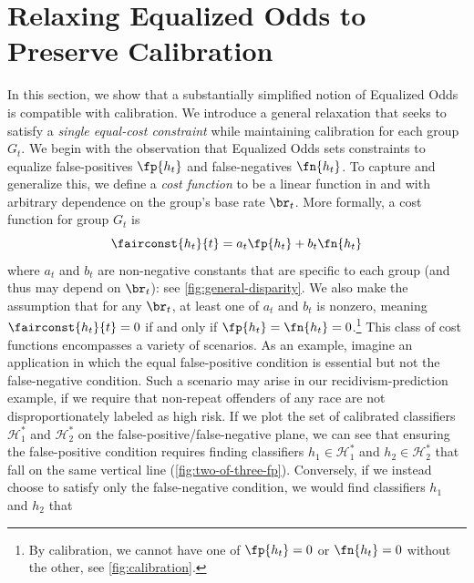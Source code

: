
\section{Relaxing Equalized Odds to Preserve Calibration}
\label{sec:relaxation}

In this section, we show that a substantially simplified notion of Equalized Odds
is compatible with calibration.
We introduce a general relaxation that seeks
to satisfy a \emph{single equal-cost constraint} while maintaining calibration for each group $G_t$.
%
We begin with the observation that Equalized Odds
sets constraints to equalize
false-positives $\fp{h_t}$ and false-negatives $\fn{h_t}$. To capture and
generalize this, we define a
\emph{cost function} \fairconstname{} to be a linear function in  and
 with arbitrary dependence on the group's base rate $\br_t$.
More formally, a cost function for group $G_t$ is
\begin{equation}
  \fairconst{h_t}{t} = a_t \fp{h_t} + b_t \fn{h_t}
  \label{eqn:cost_general}
\end{equation}
where $a_{t}$ and $b_{t}$ are non-negative constants that are specific to each group (and
thus may depend on $\br_t$): see \autoref{fig:general-disparity}. We also make
the assumption that for any $\br_t$,
at least one of $a_t$ and $b_t$ is nonzero, meaning
$\fairconst{h_t}{t} = 0$ if and only if $\fp{h_t} = \fn{h_t} = 0$.\footnote{
  By calibration, we cannot have one of $\fp{h_t} = 0$ or $\fn{h_t} = 0$
  without the other, see \autoref{fig:calibration}.
}
This class of cost functions encompasses a
variety of scenarios.
As an example, imagine an application in which the equal false-positive
condition is essential but not the
false-negative condition.
Such a scenario may arise in our recidivism-prediction example, if we require
that non-repeat offenders of any race are not disproportionately labeled as high risk.
If we plot the set of calibrated classifiers $\mathcal{H}^*_1$ and $\mathcal{H}^*_2$
on the false-positive/false-negative plane, we can see that ensuring the
false-positive condition requires finding classifiers $h_1 \in \mathcal{H}^*_1$
and $h_2 \in \mathcal{H}^*_2$ that fall on the same vertical line
(\autoref{fig:two-of-three-fp}). Conversely, if we instead choose to satisfy only
the false-negative condition, we would find classifiers $h_1$ and $h_2$ that

